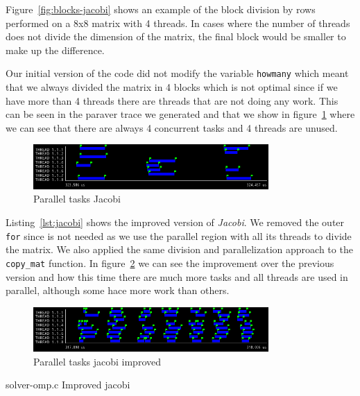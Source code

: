 Figure~\ref{fig:blocks-jacobi} shows an example of the block division by rows performed on a 8x8 matrix
with 4 threads. In cases where the number of threads does not divide the dimension of the matrix, the final
block would be smaller to make up the difference.

Our initial version of the code did not modify the variable \texttt{howmany} which meant that we always
divided the matrix in 4 blocks which is not optimal since if we have more than 4 threads there are threads
that are not doing any work. This can be seen in the paraver trace we generated and that we show in
figure~\ref{fig:trace-jacobi0} where we can see that there are always 4 concurrent tasks and 4 threads are unused.

\begin{figure}[H]
    \centering
    \includegraphics[width=0.8\textwidth]{jacobi_0_tasks}
    \caption{Parallel tasks Jacobi}%
    \label{fig:trace-jacobi0}
\end{figure}

Listing~\ref{lst:jacobi} shows the improved version of \emph{Jacobi}. We removed the outer \texttt{for}
since is not needed as we use the parallel region with all its threads to divide the matrix. We also
applied the same division and parallelization approach to the \texttt{copy\_mat} function.
In figure~\ref{fig:trace-jacobi1} we can see the improvement over the previous version and how this time
there are much more tasks and all threads are used in parallel, although some hace more work than others.

\begin{figure}[H]
    \centering
    \includegraphics[width=0.8\textwidth]{jacobi_1_tasks}
    \caption{Parallel tasks jacobi improved}%
    \label{fig:trace-jacobi1}
\end{figure}

\begin{listing}[H]
    \caption{solver-omp.c Improved jacobi}%
    \label{lst:jacobi}
    \inputminted[firstline=8,lastline=19]{c}{code/solver-omp.c}
    \vspace{-2.5em}
    \inputminted[firstline=25,lastline=52]{c}{code/solver-omp.c}
\end{listing}

